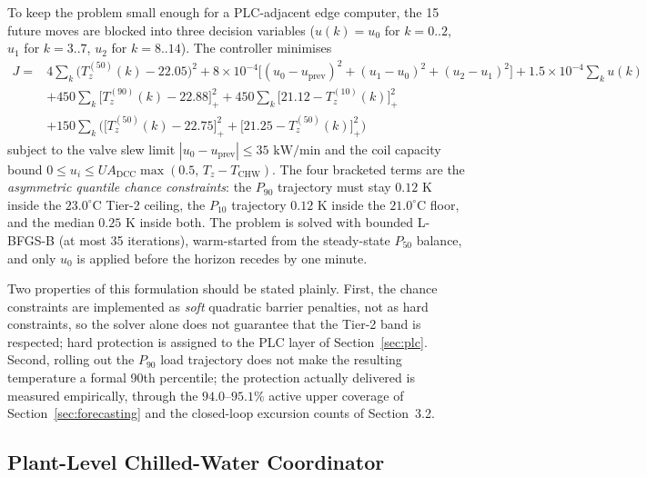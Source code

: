 To keep the problem small enough for a PLC-adjacent edge computer, the 15 future moves are blocked into three decision variables ($u(k) = u_0$ for $k = 0..2$, $u_1$ for $k = 3..7$, $u_2$ for $k = 8..14$). The controller minimises
\begin{equation}
\begin{aligned}
J ={}& 4\sum_{k}\big(T_z^{(50)}(k) - 22.05\big)^2
 + 8{\times}10^{-4}\big[(u_0 - u_{\text{prev}})^2 + (u_1 - u_0)^2 + (u_2 - u_1)^2\big]
 + 1.5{\times}10^{-4}\sum_{k} u(k) \\
&+ 450\sum_{k}\big[T_z^{(90)}(k) - 22.88\big]_+^2
 + 450\sum_{k}\big[21.12 - T_z^{(10)}(k)\big]_+^2 \\
&+ 150\sum_{k}\Big(\big[T_z^{(50)}(k) - 22.75\big]_+^2 + \big[21.25 - T_z^{(50)}(k)\big]_+^2\Big)
\end{aligned}
\label{eq:mpc_cost}
\end{equation}
subject to the valve slew limit $|u_0 - u_{\text{prev}}| \le 35\text{ kW/min}$ and the coil capacity bound $0 \le u_i \le UA_{\text{DCC}}\max(0.5,\, T_z - T_{\text{CHW}})$. The four bracketed terms are the \emph{asymmetric quantile chance constraints}: the $P_{90}$ trajectory must stay $0.12\text{ K}$ inside the $23.0^\circ\text{C}$ Tier-2 ceiling, the $P_{10}$ trajectory $0.12\text{ K}$ inside the $21.0^\circ\text{C}$ floor, and the median $0.25\text{ K}$ inside both. The problem is solved with bounded L-BFGS-B (at most 35 iterations), warm-started from the steady-state $P_{50}$ balance, and only $u_0$ is applied before the horizon recedes by one minute.

Two properties of this formulation should be stated plainly. First, the chance constraints are implemented as \emph{soft} quadratic barrier penalties, not as hard constraints, so the solver alone does not guarantee that the Tier-2 band is respected; hard protection is assigned to the PLC layer of Section~\ref{sec:plc}. Second, rolling out the $P_{90}$ load trajectory does not make the resulting temperature a formal 90th percentile; the protection actually delivered is measured empirically, through the $94.0$--$95.1\%$ active upper coverage of Section~\ref{sec:forecasting} and the closed-loop excursion counts of Section~3.2.

\subsection{Plant-Level Chilled-Water Coordinator}


